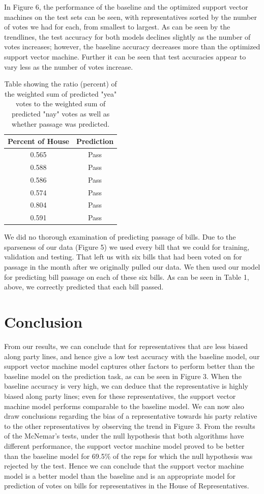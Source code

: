 \documentclass[11pt,letterpaper,twocolumn]{article}
\begin{document}
In Figure 6, the performance of the baseline and the optimized support vector machines on the test sets can be seen, with representatives sorted by the number of votes we had for each, from smallest to largest. As can be seen by the trendlines, the test accuracy for both models declines slightly as the number of votes increases; however, the baseline accuracy decreases more than the optimized support vector machine. Further it can be seen that test accuracies appear to vary less as the number of votes increase.

\begin{table}
\centering
\begin{tabular}{|c|c|} \hline
Percent of House & Prediction \\ \hline
0.565 & Pass \\ \hline
0.588 & Pass\\ \hline
0.586 & Pass\\ \hline
0.574 & Pass\\ \hline
0.804 & Pass\\ \hline
0.591 & Pass\\ \hline
\end{tabular}
\caption{Table showing the ratio (percent) of the weighted sum of predicted "yea" votes to the weighted sum of predicted "nay" votes as well as whether passage was predicted.}
\end{table}

We did no thorough examination of predicting passage of bills. Due to the sparseness of our data (Figure 5) we used every bill that we could for training, validation and testing. That left us with six bills that had been voted on for passage in the month after we originally pulled our data. We then used our model for predicting bill passage on each of these six bills. As can be seen in Table 1, above, we correctly predicted that each bill passed. 

\section{Conclusion}
From our results, we can conclude that for representatives that are less biased along party lines, and hence give a low test accuracy with the baseline model, our support vector machine model captures other factors to perform better than the baseline model on the prediction task, as can be seen in Figure 3. When the baseline accuracy is very high, we can deduce that the representative is highly biased along party lines; even for these representatives, the support vector machine model performs comparable to the baseline model. We can now also draw conclusions regarding the bias of a representative towards his party relative to the other representatives by observing the trend in Figure 3. From the results of the McNemar's tests, under the null hypothesis that both algorithms have different performance, the support vector machine model proved to be better than the baseline model for 69.5\% of the reps for which the null hypothesis was rejected by the test. Hence we can conclude that the support vector machine model is a better model than the baseline and is an appropriate model for prediction of votes on bills for representatives in the House of Representatives.
\end{document}
